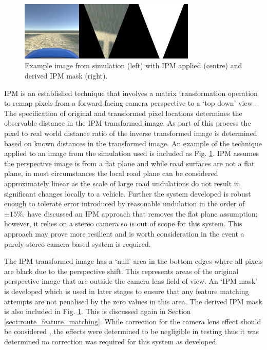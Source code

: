 \documentclass[]{aiaa-tc}%
\begin{document}
\begin{figure}
	\centering
	\includegraphics[width=0.75\textwidth]{RoadDetection/ipmSim.png}
	\caption{Example image from simulation (left) with IPM applied (centre) and derived IPM mask (right).}
	\label{f:ipmSim}
\end{figure}

IPM is an established technique that involves a matrix transformation operation to remap pixels from a forward facing camera perspective to a `top down' view \citep{compVisionTextbook}. The specification of original and transformed pixel locations determines the observable distance in the IPM transformed image. As part of this process the pixel to real world distance ratio of the inverse transformed image is determined based on known distances in the transformed image. An example of the technique applied to an image from the simulation used is included as Fig. \ref{f:ipmSim}. IPM assumes the perspective image is from a flat plane \citep{ipmForLaneTracking} and while road surfaces are not a flat plane, in most circumstances the local road plane can be considered approximately linear as the scale of large road undulations do not result in significant changes locally to a vehicle. Further the system developed is robust enough to tolerate error introduced by reasonable undulation in the order of $\pm 15\%$. \citet{extendedIPM} have discussed an IPM approach that removes the flat plane assumption; however, it relies on a stereo camera so is out of scope for this system. This approach may prove more resilient and is worth consideration in the event a purely stereo camera based system is required. 

The IPM transformed image has a `null' area in the bottom edges where all pixels are black due to the perspective shift. This represents areas of the original perspective image that are outside the camera lens field of view. An `IPM mask' is developed which is used in later stages to ensure that any feature matching attempts are not penalised by the zero values in this area. The derived IPM mask is also included in Fig. \ref{f:ipmSim}. This is discussed again in Section \ref{sect:route_feature_matching}. While correction for the camera lens effect should be considered \citep{fisheyeEffect}, the effects were determined to be negligible in testing thus it was determined no correction was required for this system as developed.
\end{document}
